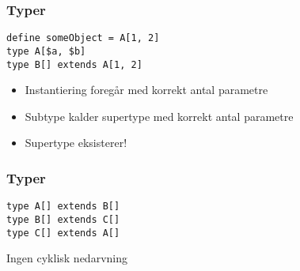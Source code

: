 \begin{frame}[fragile]
\frametitle{Typer}
\begin{lstlisting}
define someObject = A[1, 2]
type A[$a, $b]
type B[] extends A[1, 2]
\end{lstlisting}
\begin{center}
\begin{itemize}                                  
\item Instantiering foregår med korrekt antal parametre
\item Subtype kalder supertype med korrekt antal parametre
\item Supertype eksisterer!
\end{itemize}
\end{center}
\end{frame}

\begin{frame}[fragile]
\frametitle{Typer}
\begin{lstlisting}
type A[] extends B[]
type B[] extends C[]
type C[] extends A[]
\end{lstlisting}

\begin{center}                                 
\item Ingen cyklisk nedarvning
\end{center}
\end{frame}

\begin{frame}[fragile]
\begin{figure}[ht]
  \begin{center}
  \end{center}
  \label{fig:topological}
\end{figure}
\end{frame}

